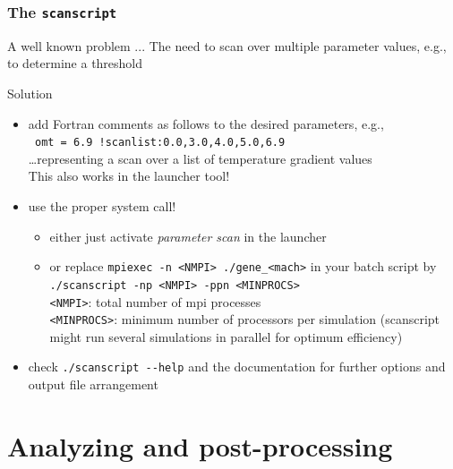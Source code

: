 \documentclass[10pt]{beamer}
\begin{document}
\begin{frame}[fragile]
  \frametitle{The {\tt scanscript}}

\begin{alertblock}{A well known problem ...}
The need to scan over multiple parameter values, e.g., to determine a threshold
\end{alertblock}

\begin{block}{Solution}
\begin{itemize}
 \item add Fortran comments as follows to the desired parameters, e.g., \\
  \verb| omt = 6.9 !scanlist:0.0,3.0,4.0,5.0,6.9| \\
  \ldots representing a scan over a list of temperature gradient values\\
  This also works in the launcher tool!\\[1ex]
 \item use the proper system call!
\begin{itemize}
\item either just activate {\em parameter scan} in the launcher
\item or replace \verb|mpiexec -n <NMPI> ./gene_<mach>| in your batch script by
 \verb|./scanscript -np <NMPI> -ppn <MINPROCS>|\\
 \verb|<NMPI>|: total number of mpi processes\\
 \verb|<MINPROCS>|: minimum number of processors per simulation 
 (scanscript might run several simulations in parallel for optimum efficiency)
\end{itemize}
\item check \verb|./scanscript --help| and the documentation for further options 
and output file arrangement
\end{itemize}
 
\end{block}


\end{frame}



\section{Analyzing and post-processing}
\end{document}
